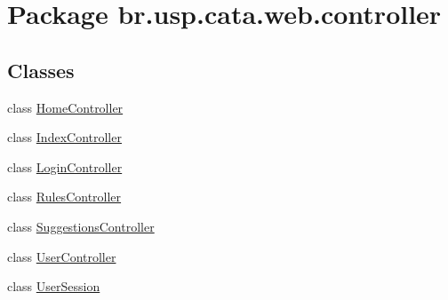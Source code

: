 \hypertarget{namespacebr_1_1usp_1_1cata_1_1web_1_1controller}{\section{Package br.\+usp.\+cata.\+web.\+controller}
\label{namespacebr_1_1usp_1_1cata_1_1web_1_1controller}
}
\subsection*{Classes}
\begin{DoxyCompactItemize}
\item 
class \hyperlink{classbr_1_1usp_1_1cata_1_1web_1_1controller_1_1_home_controller}{Home\+Controller}
\item 
class \hyperlink{classbr_1_1usp_1_1cata_1_1web_1_1controller_1_1_index_controller}{Index\+Controller}
\item 
class \hyperlink{classbr_1_1usp_1_1cata_1_1web_1_1controller_1_1_login_controller}{Login\+Controller}
\item 
class \hyperlink{classbr_1_1usp_1_1cata_1_1web_1_1controller_1_1_rules_controller}{Rules\+Controller}
\item 
class \hyperlink{classbr_1_1usp_1_1cata_1_1web_1_1controller_1_1_suggestions_controller}{Suggestions\+Controller}
\item 
class \hyperlink{classbr_1_1usp_1_1cata_1_1web_1_1controller_1_1_user_controller}{User\+Controller}
\item 
class \hyperlink{classbr_1_1usp_1_1cata_1_1web_1_1controller_1_1_user_session}{User\+Session}
\end{DoxyCompactItemize}
